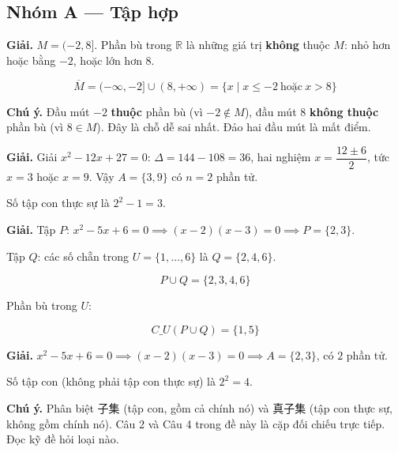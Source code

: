 \documentclass[11pt, a4paper]{article}
\begin{document}

\subsection*{Nhóm A — Tập hợp}

\begin{dapan}[1 — Đáp án A]
\textbf{Giải.} $M = (-2, 8]$. Phần bù trong $\mathbb{R}$ là những giá trị \textbf{không} thuộc $M$: nhỏ hơn hoặc bằng $-2$, hoặc lớn hơn $8$.

$$\overline{M} = (-\infty, -2] \cup (8, +\infty) = \{x \mid x \le -2 \ \text{hoặc} \ x > 8\}$$

\textbf{Chú ý.} Đầu mút $-2$ \textbf{thuộc} phần bù (vì $-2 \notin M$), đầu mút $8$ \textbf{không thuộc} phần bù (vì $8 \in M$). Đây là chỗ dễ sai nhất. Đảo hai đầu mút là mất điểm.
\end{dapan}

\begin{dapan}[2 — Đáp án C]
\textbf{Giải.} Giải $x^2 - 12x + 27 = 0$: $\Delta = 144 - 108 = 36$, hai nghiệm $x = \dfrac{12 \pm 6}{2}$, tức $x = 3$ hoặc $x = 9$. Vậy $A = \{3, 9\}$ có $n = 2$ phần tử.

Số tập con thực sự là $2^2 - 1 = 3$.
\end{dapan}

\begin{dapan}[3 — Đáp án A]
\textbf{Giải.} Tập $P$: $x^2 - 5x + 6 = 0 \implies (x-2)(x-3) = 0 \implies P = \{2, 3\}$.

Tập $Q$: các số chẵn trong $U = \{1,\dots,6\}$ là $Q = \{2, 4, 6\}$.

$$P \cup Q = \{2, 3, 4, 6\}$$

Phần bù trong $U$:

$$C\_U(P \cup Q) = \{1, 5\}$$
\end{dapan}

\begin{dapan}[4 — Đáp án D]
\textbf{Giải.} $x^2 - 5x + 6 = 0 \implies (x-2)(x-3) = 0 \implies A = \{2,3\}$, có $2$ phần tử.

Số tập con (không phải tập con thực sự) là $2^2 = 4$.

\textbf{Chú ý.} Phân biệt 子集 (tập con, gồm cả chính nó) và 真子集 (tập con thực sự, không gồm chính nó). Câu 2 và Câu 4 trong đề này là cặp đối chiếu trực tiếp. Đọc kỹ đề hỏi loại nào.
\end{dapan}
\end{document}
